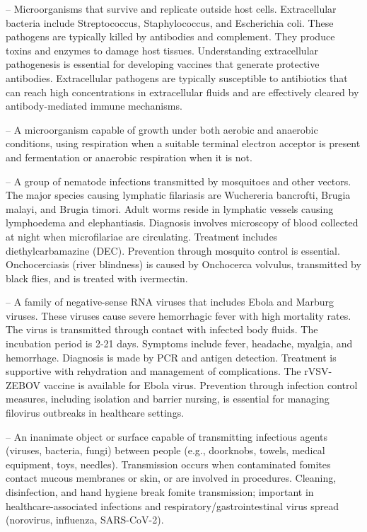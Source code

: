 -- Microorganisms that survive and replicate outside host cells. Extracellular bacteria include Streptococcus, Staphylococcus, and Escherichia coli. These pathogens are typically killed by antibodies and complement. They produce toxins and enzymes to damage host tissues. Understanding extracellular pathogenesis is essential for developing vaccines that generate protective antibodies. Extracellular pathogens are typically susceptible to antibiotics that can reach high concentrations in extracellular fluids and are effectively cleared by antibody-mediated immune mechanisms.

-- A microorganism capable of growth under both aerobic and anaerobic conditions, using respiration when a suitable terminal electron acceptor is present and fermentation or anaerobic respiration when it is not.

-- A group of nematode infections transmitted by mosquitoes and other vectors. The major species causing lymphatic filariasis are Wuchereria bancrofti, Brugia malayi, and Brugia timori. Adult worms reside in lymphatic vessels causing lymphoedema and elephantiasis. Diagnosis involves microscopy of blood collected at night when microfilariae are circulating. Treatment includes diethylcarbamazine (DEC). Prevention through mosquito control is essential. Onchocerciasis (river blindness) is caused by Onchocerca volvulus, transmitted by black flies, and is treated with ivermectin.

-- A family of negative-sense RNA viruses that includes Ebola and Marburg viruses. These viruses cause severe hemorrhagic fever with high mortality rates. The virus is transmitted through contact with infected body fluids. The incubation period is 2-21 days. Symptoms include fever, headache, myalgia, and hemorrhage. Diagnosis is made by PCR and antigen detection. Treatment is supportive with rehydration and management of complications. The rVSV-ZEBOV vaccine is available for Ebola virus. Prevention through infection control measures, including isolation and barrier nursing, is essential for managing filovirus outbreaks in healthcare settings.

-- An inanimate object or surface capable of transmitting infectious agents (viruses, bacteria, fungi) between people (e.g., doorknobs, towels, medical equipment, toys, needles). Transmission occurs when contaminated fomites contact mucous membranes or skin, or are involved in procedures. Cleaning, disinfection, and hand hygiene break fomite transmission; important in healthcare-associated infections and respiratory/gastrointestinal virus spread (norovirus, influenza, SARS-CoV-2).

